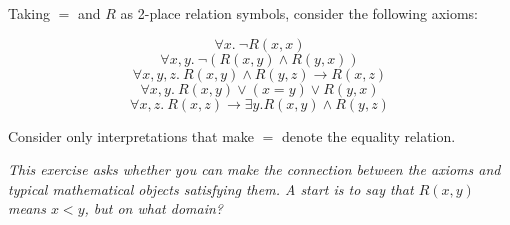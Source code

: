 \documentclass{supervision}
\begin{document}
\begin{questions}

    \question Taking $=$ and $R$ as 2-place relation symbols, consider the following axioms:

      \setcounter{equation}{0}
      \begin{equation}
        \forall x.       \: \lnot R(x, x)
      \end{equation}
      \begin{equation}
        \forall x, y.    \: \lnot (R(x, y) \land R(y, x))
      \end{equation}
      \begin{equation}
        \forall x, y, z. \: R(x, y) \land R(y, z) \to R(x, z)
      \end{equation}
      \begin{equation}
        \forall x, y.    \: R(x, y) \lor (x = y) \lor R(y, x)
      \end{equation}
      \begin{equation}
        \forall x, z.    \:R(x, z) \to \exists y. R(x, y) \land R(y, z)
      \end{equation}



      Consider only interpretations that make $=$ denote the equality relation.

      \emph{This exercise asks whether you can make the connection between the axioms and typical mathematical objects satisfying them. A start is to say that $R(x, y)$ means $x < y$, but on what domain?}

      \begin{parts}

\end{parts}
\end{questions}
\end{document}
